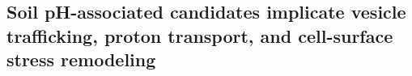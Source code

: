 \documentclass[unnumsec,webpdf,contemporary,large]{oup-authoring-template}%
\theoremstyle{thmstyleone}%
\theoremstyle{thmstyletwo}%
\theoremstyle{thmstylethree}%
\begin{document}





    
\subsection{Soil pH-associated candidates implicate vesicle trafficking, proton transport, and cell-surface stress remodeling}
\end{document}
